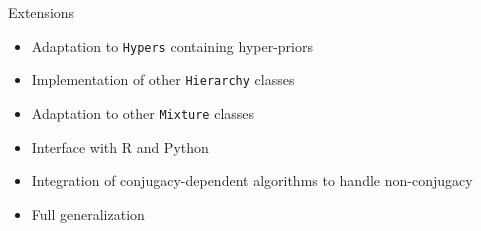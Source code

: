 \begin{frame}[fragile]{Extensions}

	\begin{itemize}
	\item Adaptation to \verb|Hypers| containing hyper-priors
	\item Implementation of other \verb|Hierarchy| classes
	\item Adaptation to other \verb|Mixture| classes
	\item Interface with R and Python
	\item Integration of conjugacy-dependent algorithms to handle non-conjugacy
	\item Full generalization
	\end{itemize}

\end{frame}
